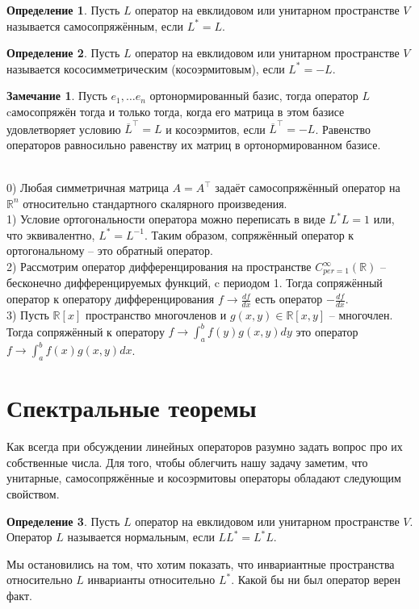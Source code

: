 \documentclass[10pt,a4paper,oneside]{book} %
\theoremstyle{definition}
\newtheorem*{rem}{Замечание}
\newtheorem*{defn}{Определение}
\newcommand{\mb}[1]{\mathbb{#1}}
\newcommand{\ovl}{\overline}
\def\exm{\noindent {\bf Примеры:}}
\def\dfn{\begin{defn}}
\def\edfn{\end{defn}}
\def\rm{\begin{rem}}
\def\erm{\end{rem}}
\begin{document}
\dfn Пусть $L$ оператор на евклидовом или унитарном пространстве $V$ называется самосопряжённым, если $L^*=L$.
\edfn

\dfn Пусть $L$ оператор на евклидовом или унитарном пространстве $V$ называется кососимметрическим (косоэрмитовым), если $L^*=-L$.
\edfn

\rm Пусть $e_1,\dots e_n$ ортонормированный базис, тогда оператор $L$ cамосопряжён тогда и только тогда, когда его матрица в этом базисе удовлетворяет условию $\ovl{L}^{\top}=L$ и косоэрмитов, если $\ovl{L}^{\top}=-L$.
\proof Равенство операторов равносильно равенству их матриц в ортонормированном базисе.
\endproof
\erm



\exm\\
0) Любая симметричная матрица $A=A^{\top}$ задаёт самосопряжённый оператор на $\mb R^n$ относительно стандартного скалярного произведения.\\
1) Условие ортогональности оператора можно переписать в виде $L^*L=1$ или, что эквивалентно, $L^*=L^{-1}$. Таким образом, сопряжённый оператор к ортогональному -- это обратный оператор.\\
2) Рассмотрим оператор дифференцирования на пространстве $C^{\infty}_{per=1}(\mb R)$ -- бесконечно дифференцируемых функций, c периодом 1. Тогда сопряжённый оператор к оператору дифференцирования  $f \to \frac{df}{dx}$ есть оператор $-\frac{df}{dx}$.\\
3) Пусть $\mb R[x]$ пространство многочленов и $g(x,y) \in \mb R[x,y]$ -- многочлен. Тогда сопряжённый к оператору $f \to \int_{a}^b f(y)g(x,y)dy$ это оператор $f\to\int_{a}^b f(x)g(x,y)dx$.





\section{Спектральные теоремы}

Как всегда при обсуждении линейных операторов разумно задать вопрос про их собственные числа. Для того, чтобы облегчить нашу задачу заметим, что унитарные, самосопряжённые и косоэрмитовы операторы обладают следующим свойством.

\dfn Пусть $L$ оператор на евклидовом или унитарном пространстве $V$. Оператор $L$ называется нормальным, если $LL^*=L^*L$.
\edfn



Мы остановились на том, что хотим показать, что инвариантные пространства относительно $L$ инварианты относительно $L^*$. Какой бы ни был оператор верен факт.
\end{document}
